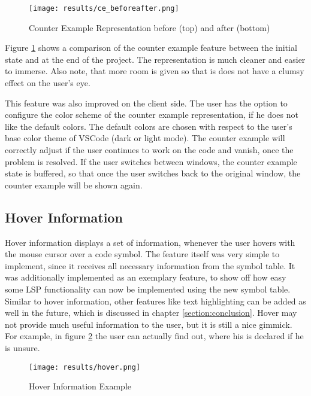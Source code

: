 \begin{figure}[h]
    \centering
    \texttt{[image: results/ce\_beforeafter.png]}
    \caption{Counter Example Representation before (top) and after (bottom)}
    \label{fig:ce_beforeafter}
\end{figure}

Figure \ref{fig:ce_beforeafter} shows a comparison of the counter example feature between the initial state and at the end of the project.
The representation is much cleaner and easier to immerse.
Also note, that more room is given so that is does not have a clumsy effect on the user's eye. 

This feature was also improved on the client side.
The user has the option to configure the color scheme of the counter example representation, if he does not like the default colors.
The default colors are chosen with respect to the user's base color theme of VSCode (dark or light mode).
The counter example will correctly adjust if the user continues to work on the code and vanish, once the problem is resolved.
If the user switches between windows, the counter example state is buffered, so that once the user switches back to the original window, the counter example will be shown again.


\subsection{Hover Information}
Hover information displays a set of information, whenever the user hovers with the mouse cursor over a code symbol.
The feature itself was very simple to implement, since it receives all necessary information from the symbol table.
It was additionally implemented as an exemplary feature, to show off how easy some LSP functionality can now be implemented using the new symbol table.
Similar to hover information, other features like text highlighting can be added as well in the future, which is discussed in chapter \ref{section:conclusion}.
Hover may not provide much useful information to the user, but it is still a nice gimmick.
For example, in figure \ref{fig:hover} the user can actually find out, where his  is declared if he is unsure.

\begin{figure}[h]
    \centering
    \texttt{[image: results/hover.png]}
    \caption{Hover Information Example}
    \label{fig:hover}
\end{figure}

